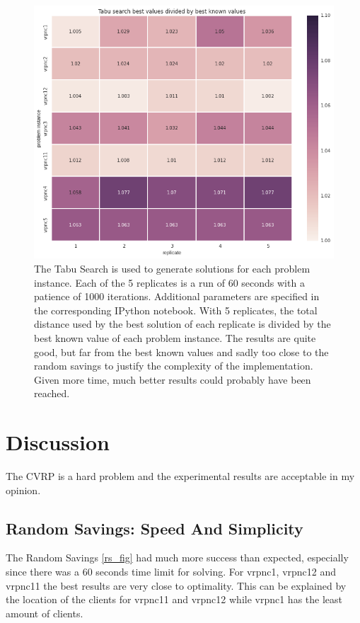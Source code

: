 \documentclass{article} %
\begin{document}
\begin{figure}[!htb]
\begin{center}
 \includegraphics[scale=0.45]{figures/tabu_search}
 \caption{\small  The Tabu Search is used to generate solutions for each problem instance. Each of the 5 replicates is a run of 60 seconds with a patience of 1000 iterations. Additional parameters are specified in the corresponding IPython notebook. With 5 replicates, the total distance used by the best solution of each replicate is divided by the best known value of each problem instance. The results are quite good, but far from the best known values and sadly too close to the random savings to justify the complexity of the implementation. Given more time, much better results could probably have been reached.}
 \label{ts_fig}
 \end{center}
\end{figure}


\newpage
\section{Discussion}
\label{analysis_results}

The CVRP is a hard problem and the experimental results are acceptable in my opinion.\newline

\subsection{Random Savings: Speed And Simplicity}
The Random Savings \ref{rs_fig} had much more success than expected, especially since there was a 60 seconds time limit for solving. For vrpnc1, vrpnc12 and vrpnc11 the best results are very close to optimality. This can be explained by the location of the clients for vrpnc11 and vrpnc12 while vrpnc1 has the least amount of clients.\newline
\end{document}

